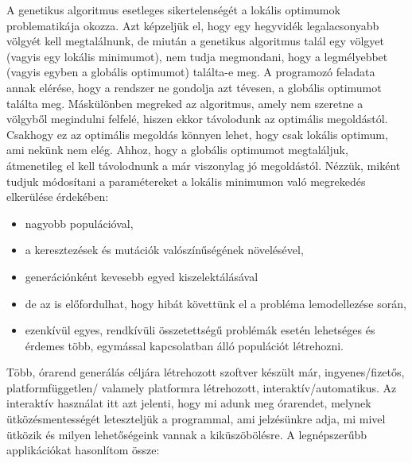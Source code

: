 A genetikus algoritmus esetleges sikertelenségét a lokális optimumok problematikája okozza. 
Azt képzeljük el, hogy egy hegyvidék legalacsonyabb völgyét kell megtalálnunk, de miután a
genetikus algoritmus talál egy völgyet (vagyis egy lokális minimumot), nem tudja megmondani,
hogy a legmélyebbet (vagyis egyben a globális optimumot) találta-e meg. A programozó feladata
annak elérése, hogy a rendszer ne gondolja azt tévesen, a globális optimumot találta meg. 
Máskülönben megreked az algoritmus, amely nem szeretne a völgyből megindulni felfelé, hiszen 
ekkor távolodunk az optimális megoldástól. Csakhogy ez az optimális megoldás könnyen lehet,
hogy csak lokális optimum, ami nekünk nem elég. Ahhoz, hogy a globális optimumot megtaláljuk,
átmenetileg el kell távolodnunk a már viszonylag jó megoldástól. Nézzük, miként tudjuk
módosítani a paramétereket a lokális minimumon való megrekedés elkerülése érdekében:
\begin{itemize}
	\item nagyobb populációval,
	\item a keresztezések és mutációk valószínűségének növelésével,
	\item generációnként kevesebb egyed kiszelektálásával
	\item de az is előfordulhat, hogy hibát követtünk el a probléma lemodellezése során,
	\item ezenkívül egyes, rendkívüli összetettségű problémák esetén lehetséges és érdemes több, egymással kapcsolatban álló populációt létrehozni.
\end{itemize}


Több, órarend generálás céljára létrehozott szoftver készült már, ingyenes/fizetős, platformfüggetlen/
valamely platformra létrehozott, interaktív/automatikus. Az interaktív használat itt azt
jelenti, hogy mi adunk meg órarendet, melynek ütközésmentességét leteszteljük a programmal,
ami jelzésünkre adja, mi mivel ütközik és milyen lehetőségeink vannak a kiküszöbölésre. 
A legnépszerűbb applikációkat hasonlítom össze:

